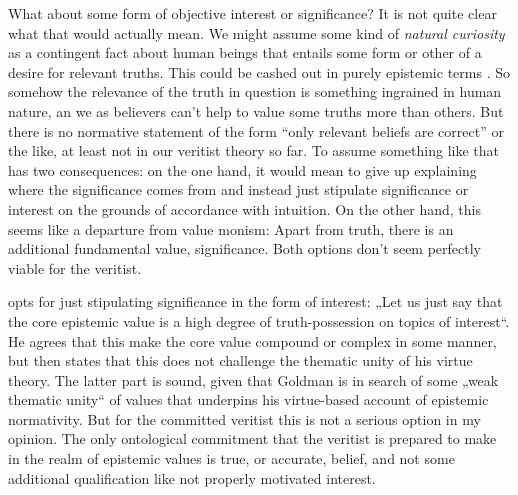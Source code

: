 \documentclass[12pt,numbers=noenddot]{scrartcl}
\begin{document}
What about some form of objective interest or significance? It is not quite clear what that would actually mean. We might assume some kind of \emph{natural curiosity} as a contingent fact about human beings that entails some form or other of a desire for relevant truths. This could be cashed out in purely epistemic terms \autocite[333]{Ahlstrom-Vij2013}. So somehow the relevance of the truth in question is something ingrained in human nature, an we as believers can't help to value some truths more than others. But there is no normative statement of the form “only relevant beliefs are correct” or the like, at least not in our veritist theory so far. To assume something like that has two consequences: on the one hand, it would mean to give up explaining where the significance comes from and instead just stipulate significance or interest on the grounds of accordance with intuition. On the other hand, this seems like a departure from value monism: Apart from truth, there is an additional fundamental value, significance. Both options don't seem perfectly viable for the veritist.

\textcite[61]{Goldman2002-GOLTUO-2} opts for just stipulating significance in the form of interest: „Let us just say that the core epistemic value is a high degree of truth-possession on topics of interest“. He agrees that this make the core value compound or complex in some manner, but then states that this does not challenge the thematic unity of his virtue theory. The latter part is sound, given that Goldman is in search of some „weak thematic unity“ of values that underpins his virtue-based account of epistemic normativity. But for the committed veritist this is not a serious option in my opinion. The only ontological commitment that the veritist is prepared to make in the realm of epistemic values is true, or accurate, belief, and not some additional qualification like not properly motivated interest.
\end{document}
